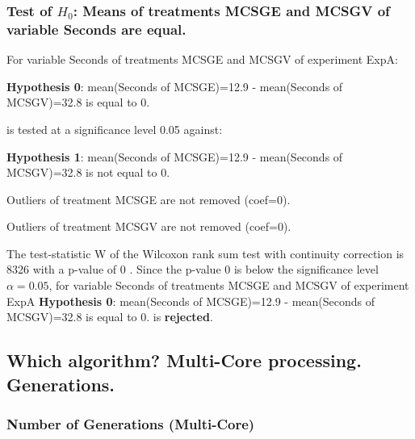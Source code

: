 \documentclass[18pt,c]{beamer}
\makeatletter
\let\beamer@writeslidentry@miniframeson=\beamer@writeslidentry
\newcommand*{\miniframeson}{\let\beamer@writeslidentry=\beamer@writeslidentry@miniframeson}
\makeatother
\begin{document}
\begin{frame}[t]
 \frametitle{Test of $H_{0}$: Means of treatments MCSGE and MCSGV of variable Seconds are equal. }
 \scriptsize
 For variable Seconds of treatments MCSGE and MCSGV of experiment ExpA:

\vspace{1mm}
{\bf Hypothesis 0}: mean(Seconds of MCSGE)=12.9 - mean(Seconds of MCSGV)=32.8 is equal to 0.


 \begin{center} is tested at a significance level 0.05 against: \end{center}

{\bf Hypothesis 1}: mean(Seconds of MCSGE)=12.9 - mean(Seconds of MCSGV)=32.8 is not equal to 0.
\vspace{1mm}
\vspace{1mm}

 Outliers of treatment MCSGE  are not removed (coef=0).

 Outliers of treatment MCSGV  are not removed (coef=0).
\vspace{1mm}
 
 The test-statistic W of the Wilcoxon rank sum test with continuity correction is 8326 with a p-value of 0 .
 Since the p-value 0 is below the significance level $\alpha= 0.05 $,
 for variable Seconds of treatments MCSGE and MCSGV of experiment ExpA 
 {\bf Hypothesis 0}: mean(Seconds of MCSGE)=12.9 - mean(Seconds of MCSGV)=32.8 is equal to 0.
is {\bf rejected}.

 \end{frame}
\miniframeson
\subsection{Which algorithm? Multi-Core processing. Generations.}
 \begin{frame}
 \fontsize{8pt}{9pt}\selectfont
 \frametitle{ Number of Generations (Multi-Core) }

 \label{ExpAStatsTable012.tex}  
 \end{frame}
\end{document}
